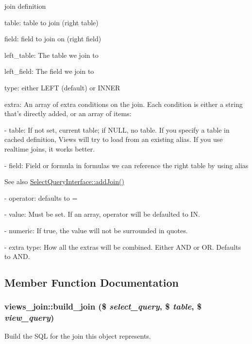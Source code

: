 join definition
\begin{DoxyItemize}
\item table: table to join (right table)
\item field: field to join on (right field)
\item left\_\-table: The table we join to
\item left\_\-field: The field we join to
\item type: either LEFT (default) or INNER
\item extra: An array of extra conditions on the join. Each condition is either a string that's directly added, or an array of items:
\item -\/ table: If not set, current table; if NULL, no table. If you specify a table in cached definition, Views will try to load from an existing alias. If you use realtime joins, it works better.
\item -\/ field: Field or formula in formulas we can reference the right table by using alias \begin{DoxySeeAlso}{See also}
\hyperlink{interfaceSelectQueryInterface_a974ba99af27e9b77d7f5fc69ec81bd45}{SelectQueryInterface::addJoin()}
\end{DoxySeeAlso}

\item -\/ operator: defaults to =
\item -\/ value: Must be set. If an array, operator will be defaulted to IN.
\item -\/ numeric: If true, the value will not be surrounded in quotes.
\item -\/ extra type: How all the extras will be combined. Either AND or OR. Defaults to AND. 
\end{DoxyItemize}

\subsection{Member Function Documentation}
\hypertarget{classviews__join_a1e7fae5813fcec89a848bc6326f152c5}{
\subsubsection[{build\_\-join}]{\setlength{\rightskip}{0pt plus 5cm}views\_\-join::build\_\-join (\$ {\em select\_\-query}, \/  \$ {\em table}, \/  \$ {\em view\_\-query})}}
\label{classviews__join_a1e7fae5813fcec89a848bc6326f152c5}
Build the SQL for the join this object represents.

